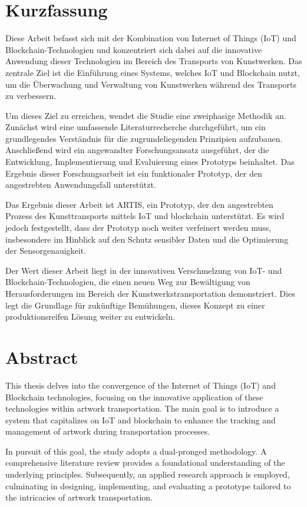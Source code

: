 \chapter*{Kurzfassung}
Diese Arbeit befasst sich mit der Kombination von Internet of Things (IoT) und Blockchain-Technologien und konzentriert sich dabei auf die innovative Anwendung dieser Technologien im Bereich des Transports von Kunstwerken. Das zentrale Ziel ist die Einführung eines Systems, welches IoT und Blockchain nutzt, um die Überwachung und Verwaltung von Kunstwerken während des Transports zu verbessern.

Um dieses Ziel zu erreichen, wendet die Studie eine zweiphasige Methodik an. Zunächst wird eine umfassende Literaturrecherche durchgeführt, um ein grundlegendes Verständnis für die zugrundeliegenden Prinzipien aufzubauen. Anschließend wird ein angewandter Forschungsansatz ausgeführt, der die Entwicklung, Implementierung und Evaluierung eines Prototyps beinhaltet. Das Ergebnis dieser Forschungsarbeit ist ein funktionaler Prototyp, der den angestrebten Anwendungsfall unterstützt.

Das Ergebnis dieser Arbeit ist ARTIS, ein Prototyp, der den angestrebten Prozess des Kunsttransports mittels IoT und blockchain unterstützt. Es wird jedoch festgestellt, dass der Prototyp noch weiter verfeinert werden muss, insbesondere im Hinblick auf den Schutz sensibler Daten und die Optimierung der Sensorgenauigkeit.

Der Wert dieser Arbeit liegt in der innovativen Verschmelzung von IoT- und Blockchain-Technologien, die einen neuen Weg zur Bewältigung von Herausforderungen im Bereich der Kunstwerkstransportation demonstriert. Dies legt die Grundlage für zukünftige Bemühungen, dieses Konzept zu einer produktionsreifen Lösung weiter zu entwickeln.


\chapter*{Abstract}
This thesis delves into the convergence of the Internet of Things (IoT) and Blockchain technologies, focusing on the innovative application of these technologies within artwork transportation. The main goal is to introduce a system that capitalizes on IoT and blockchain to enhance the tracking and management of artwork during transportation processes.

In pursuit of this goal, the study adopts a dual-pronged methodology. A comprehensive literature review provides a foundational understanding of the underlying principles. Subsequently, an applied research approach is employed, culminating in designing, implementing, and evaluating a prototype tailored to the intricacies of artwork transportation.

